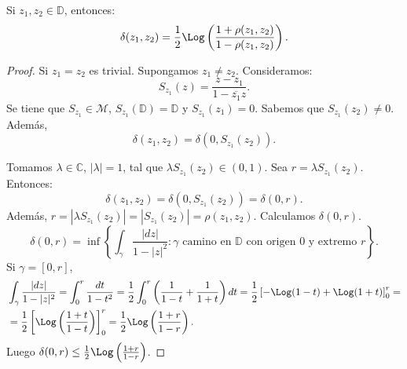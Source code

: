 \begin{proposition}
    Si $z_1, z_2 \in \mathbb{D}$, entonces:
    $$\delta(z_1, z_2) = \frac{1}{2} \Log\left(\frac{1+\rho(z_1, z_2)}{1-\rho(z_1, z_2)}\right).$$
\end{proposition}

\begin{proof}
    Si $z_1 = z_2$ es trivial.
    Supongamos $z_1 \neq z_2$.
    Consideramos:
    $$S_{z_1}(z) = \frac{z-z_1}{1-\overline{z_1}z}.$$
    Se tiene que $S_{z_1} \in \mathcal{M}$, $S_{z_1}(\mathbb{D}) = \mathbb{D}$ y $S_{z_1}(z_1) = 0$.
    Sabemos que $S_{z_1}(z_2) \neq 0$.
    Además,
    $$\delta(z_1, z_2) = \delta(0, S_{z_1}(z_2)).$$

    Tomamos $\lambda \in \mathbb{C}$, $|\lambda| = 1$, tal que $\lambda S_{z_1}(z_2) \in (0, 1)$.
    Sea $r = \lambda S_{z_1}(z_2)$.
    Entonces:
    $$\delta(z_1, z_2) = \delta(0, S_{z_1}(z_2)) = \delta(0, r).$$
    Además, $r = |\lambda S_{z_1}(z_2)| = |S_{z_1}(z_2)| = \rho(z_1, z_2)$.
    Calculamos $\delta(0, r)$.
    $$\delta(0, r) = \inf \left\{\int_\gamma \frac{|dz|}{1-|z|^2} : \gamma \text{ camino en } \mathbb{D} \text{ con origen } 0 \text{ y extremo } r\right\}.$$
    Si $\gamma = [0, r]$,
    \begin{align*}
         & \int_\gamma \frac{|dz|}{1-|z|^2} = \int_0^r \frac{dt}{1-t^2} = \frac{1}{2} \int_0^r \left(\frac{1}{1-t} + \frac{1}{1+t}\right)dt = \frac{1}{2} \left[-\Log(1-t) + \Log(1+t)\right]_0^r = \\
         & = \frac{1}{2} \left[\Log\left(\frac{1+t}{1-t}\right)\right]_0^r = \frac{1}{2} \Log\left(\frac{1+r}{1-r}\right).
    \end{align*}
    Luego $\delta(0, r) \leq \frac{1}{2} \Log\left(\frac{1+r}{1-r}\right)$.


\end{proof}
